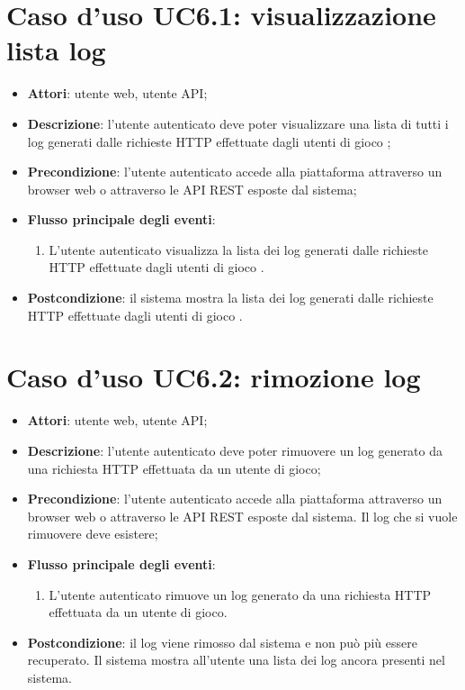\section{Caso d'uso UC6.1: visualizzazione lista log}
\begin{itemize}
\item \textbf{Attori}: utente web, utente API;
\item \textbf{Descrizione}: l'utente autenticato deve poter visualizzare una lista di tutti i log generati dalle richieste HTTP effettuate dagli utenti di gioco ; 
      \item \textbf{Precondizione}: l'utente autenticato accede alla piattaforma attraverso un browser web o attraverso le API REST esposte dal sistema;

        \item \textbf{Flusso principale degli eventi}:
          \begin{enumerate}
          \item L'utente autenticato visualizza la lista dei log generati dalle richieste HTTP effettuate dagli utenti di gioco .

      \end{enumerate}
    \item \textbf{Postcondizione}: il sistema mostra la lista dei log generati dalle richieste HTTP effettuate dagli utenti di gioco .
  \end{itemize}
\hypertarget{UC6.2}{}
\section{Caso d'uso UC6.2: rimozione log}
\begin{itemize}
\item \textbf{Attori}: utente web, utente API;
\item \textbf{Descrizione}: l'utente autenticato deve poter rimuovere un log generato da una richiesta HTTP effettuata da un utente di gioco; 
      \item \textbf{Precondizione}: l'utente autenticato accede alla piattaforma attraverso un browser web o attraverso le API REST esposte dal sistema. Il log che si vuole rimuovere deve esistere;

        \item \textbf{Flusso principale degli eventi}:
          \begin{enumerate}
          \item L'utente autenticato rimuove un log generato da una richiesta HTTP effettuata da un utente di gioco.

      \end{enumerate}
    \item \textbf{Postcondizione}: il log viene rimosso dal sistema e non può più essere recuperato. Il sistema mostra all'utente una lista dei log ancora presenti nel sistema.
  \end{itemize}
\hypertarget{UC6.3}{}
